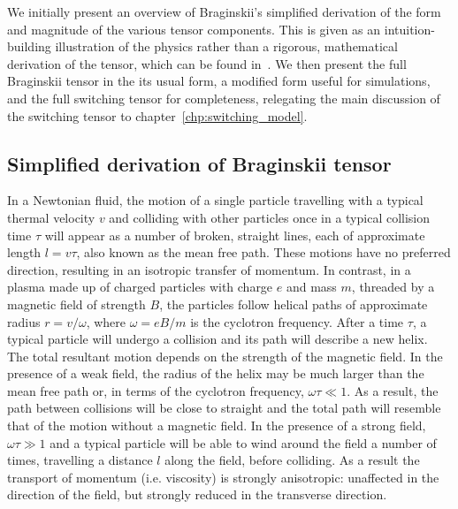 We initially present an overview of Braginskii's simplified derivation of the form and magnitude of the various tensor components. This is given as an intuition-building illustration of the physics rather than a rigorous, mathematical derivation of the tensor, which can be found in~\cite{braginskiiTransportProcessesPlasma1965}. We then present the full Braginskii tensor in the its usual form, a modified form useful for simulations, and the full switching tensor for completeness, relegating the main discussion of the switching tensor to chapter~\ref{chp:switching_model}.

\subsection{Simplified derivation of Braginskii tensor}

In a Newtonian fluid, the motion of a single particle travelling with a typical thermal velocity $v$ and colliding with other particles once in a typical collision time $\tau$ will appear as a number of broken, straight lines, each of approximate length $l = v\tau$, also known as the mean free path. These motions have no preferred direction, resulting in an isotropic transfer of momentum. In contrast, in a plasma made up of charged particles with charge $e$ and mass $m$, threaded by a magnetic field of strength $B$, the particles follow helical paths of approximate radius $r = v/\omega$, where $\omega = eB/m$ is the cyclotron frequency. After a time $\tau$, a typical particle will undergo a collision and its path will describe a new helix. The total resultant motion depends on the strength of the magnetic field. In the presence of a weak field, the radius of the helix may be much larger than the mean free path or, in terms of the cyclotron frequency, $\omega \tau \ll 1$. As a result, the path between collisions will be close to straight and the total path will resemble that of the motion without a magnetic field. In the presence of a strong field, $\omega \tau \gg 1$ and a typical particle will be able to wind around the field a number of times, travelling a distance $l$ along the field, before colliding. As a result the transport of momentum (i.e. viscosity) is strongly anisotropic: unaffected in the direction of the field, but strongly reduced in the transverse direction.

